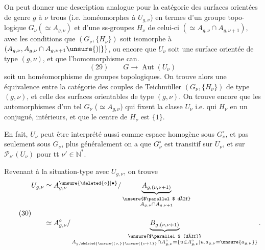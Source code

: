 On peut donner une description analogue
pour la catégorie des surfaces orientées de
genre $g$ à $\nu$ trous (i.e. homéomorphes
à $U_{g,\nu}$) en termes d'un groupe topo-
logique $G_\nu(\simeq A_{g,\nu})$ et d'une 
ss-groupes $H_\nu$ de celui-ci $(\simeq A_{g,\nu}\cap A_{g,\nu+1})$, avec les
conditions que $(G_\nu,\{H_\nu\})$ soit isomorphe
à $(A_{g,\nu},A_{g,\nu}\cap A_{g,\nu+1}\unsure{)|\}}$, ou encore
que $U_\nu$  soit une surface orientée de
type $(g,\nu)$, et que l'homomorphisme can.
\[
(29)\qquad G\longrightarrow\operatorname{Aut}(U_\nu)
\]
soit un homéomorphisme de groupes
topologiques. On trouve alors une
équivalence entre la catégorie des
couples de Teichmüller $(G_\nu,\{H_\nu\})$
de type $(g,\nu)$, et celle des surfaces
orientables de type $(g,\nu)$. On trouve encore
que les automorphismes d'un tel $G_\nu$ ($\simeq A_{g,\nu}$) qui fixent la classe $U_\nu$ i.e. qui  $H_\nu$ en un conjugué,  intérieurs, et que le centre de $H_\nu$ est $\{1\}$.

En fait, $U_\nu$ peut être interprété aussi comme espace homogène sous $G_\nu^\circ$, et pas seulement sous $G_\nu$, plus généralement on a que $G_\nu^\circ$ est transitif sur $U_\nu$, et  sur $\mathcal P_{\nu'}(U_\nu)$ pour tt $\nu'\in\mathbb N^*$.

Revenant à la situation-type avec $U_{g,\nu}$, on trouve
\[
\tag{30}
\begin{aligned}
U_{g,\nu}
&\simeq A_{g,\nu}^{\unsure{\deleted{\circ}|\bullet}}/
\underbrace{A_{g,(\nu,\nu+1)}}_{\substack{\text{\unsure{$\parallel$ déf}}\\ A_{g,\nu}\cap A_{g,\nu+1}}}\\[1.2em]
&\simeq A_{g,\nu}^{\circ}/
\underbrace{B_{g,(\nu,\nu+1)}}_{\substack{\text{\unsure{$\parallel$ (déf)}}\\
 A_{g,\deleted{\unsure{(\nu,}}\unsure{\{\nu+1\}}}\cap A_{g,\nu}^{\circ}
 =\{u\in A_{g,\nu}^{\circ}\mid u.a_{g,\nu}=\unsure{a_{g,\nu}}\}}}.
\end{aligned}
\]

